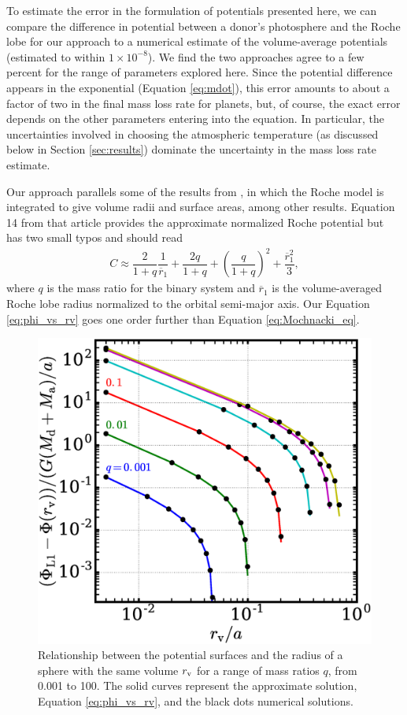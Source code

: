 \documentclass{aastex}
\newcommand{\be}{\begin{eqnarray}}
\newcommand{\ee}{\end{eqnarray}}
\newcommand{\rv}{r_{\rm v}}
\begin{document}
To estimate the error in the formulation of potentials presented here, we can compare the difference in potential between a donor's photosphere and the Roche lobe for our approach to a numerical estimate of the volume-average potentials (estimated to within $1\times10^{-8}$). We find the two approaches agree to a few percent for the range of parameters explored here. Since the potential difference appears in the exponential (Equation \ref{eq:mdot}), this error amounts to about a factor of two in the final mass loss rate for planets, but, of course, the exact error depends on the other parameters entering into the equation. In particular, the uncertainties involved in choosing the atmospheric temperature (as discussed below in Section \ref{sec:results}) dominate the uncertainty in the mass loss rate estimate.

Our approach parallels some of the results from \citet{1984ApJS...55..551M}, in which the Roche model is integrated to give volume radii and surface areas, among other results. Equation 14 from that article provides the approximate normalized Roche potential but has two small typos and should read
\be
C \approx \dfrac{2}{1 + q}\dfrac{1}{\overline{r}_1} + \dfrac{2 q}{1 + q} + \left( \dfrac{q}{1 + q} \right)^2 + \dfrac{\overline{r}_1^2}{3},
\label{eq:Mochnacki_eq}
\ee
where $q$ is the mass ratio for the binary system and $\overline{r}_1$ is the volume-averaged Roche lobe radius normalized to the orbital semi-major axis. Our Equation \ref{eq:phi_vs_rv} goes one order further than Equation \ref{eq:Mochnacki_eq}.

\begin{figure}
\includegraphics[width=\textwidth]{potential_vs_volume_radius}
\caption{Relationship between the potential surfaces and the radius of a sphere with the same volume $\rv$ for a range of mass ratios $q$, from 0.001 to 100. The solid curves represent the approximate solution, Equation \ref{eq:phi_vs_rv}, and the black dots numerical solutions.}
\label{fig:potential_vs_volume_radius}
\end{figure}
\end{document}
